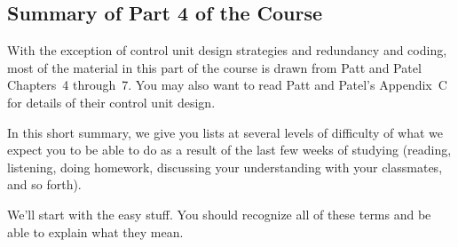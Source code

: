 \classtitle

\subsection{Summary of Part 4 of the Course}

With the exception of control unit design strategies and redundancy 
and coding, most of the material in this part of the course is drawn from
Patt and Patel Chapters~4 through~7.  You may also want to read Patt and 
Patel's Appendix~C for details of their control unit design.

In this short summary, we give you lists at several levels of difficulty
of what we expect you to be able to do as a result of the last few weeks
of studying (reading, listening, doing homework, discussing your
understanding with your classmates, and so forth).

We'll start with the easy stuff.  You should recognize all of these terms
and be able to explain what they mean.  

\vfill


